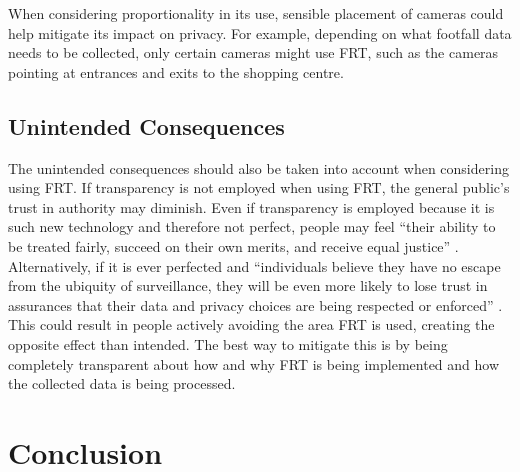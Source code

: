 \documentclass{article}
\begin{document}
When considering proportionality in its use, sensible placement of cameras could help mitigate its impact on privacy. For example, depending on what footfall data needs to be collected, only certain cameras might use FRT, such as the cameras pointing at entrances and exits to the shopping centre. 

\subsection{Unintended Consequences}

The unintended consequences should also be taken into account when considering using FRT. If transparency is not employed when using FRT, the general public's trust in authority may diminish. Even if transparency is employed because it is such new technology and therefore not perfect, people may feel “their ability to be treated fairly, succeed on their own merits, and receive equal justice” \cite{EthicsOfFRTOxford}. Alternatively, if it is ever perfected and “individuals believe they have no escape from the ubiquity of surveillance, they will be even more likely to lose trust in assurances that their data and privacy choices are being respected or enforced” \cite{EthicsOfFRTOxford}. This could result in people actively avoiding the area FRT is used, creating the opposite effect than intended. The best way to mitigate this is by being completely transparent about how and why FRT is being implemented and how the collected data is being processed.

\section{Conclusion}
\end{document}
